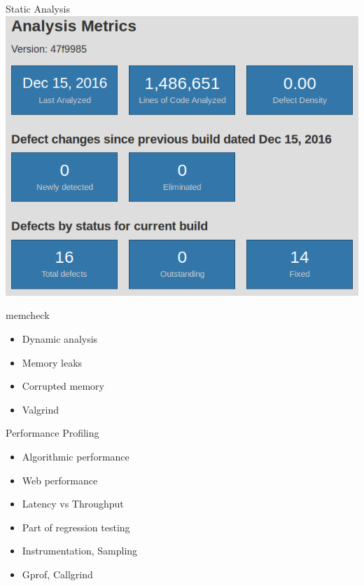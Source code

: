 \documentclass{beamer}
\begin{document}
\begin{frame}{Static Analysis}
	\includegraphics[width=\linewidth]{coverity-metrics.png}
\end{frame}

\begin{frame}{memcheck}
	\begin{itemize}
		\item Dynamic analysis
		\item Memory leaks
		\item Corrupted memory
		\item Valgrind
	\end{itemize}
\end{frame}

\begin{frame}{Performance Profiling}
	\begin{itemize}
		\item Algorithmic performance
		\item Web performance
		\item Latency vs Throughput
		\item Part of regression testing
		\item Instrumentation, Sampling
		\item Gprof, Callgrind
	\end{itemize}
\end{frame}
\end{document}
